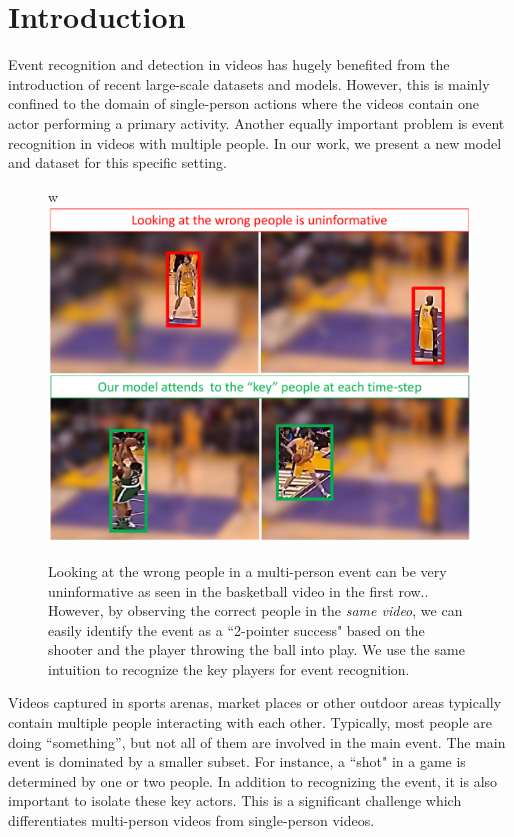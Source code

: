 \section{Introduction}

Event recognition and detection in videos has hugely benefited from the
introduction of recent large-scale datasets
\cite{THUMOS,UCF101,Karpathy_CVPR14,MED11} and models.  However, this is mainly
confined to the domain of single-person actions where the videos contain one
actor performing a primary activity.  Another equally important problem is
event recognition in videos with multiple people. In our work, we present a new
model and dataset for this specific setting.

\begin{figure}[ht!]
\begin{center}w
  \includegraphics[width=3.2 in]{images/pull_figure_v3_cropped.pdf}
\end{center}
\caption{Looking at the wrong people in a multi-person event can be very uninformative
  as seen in the basketball video in the first row.. However, by observing the correct
  people in the \emph{same video}, we can easily identify the event as a ``2-pointer success" based
  on the shooter and the player throwing the ball into play. We use the same intuition
to recognize the key players for event recognition.}
\label{fig:pull_figure}
\end{figure}

Videos captured in sports arenas, market places or other outdoor areas
typically contain multiple people interacting with each other.
Typically, most people are doing ``something'', but not all of them are involved in the main event.
The main event is dominated by a smaller subset. For instance, a ``shot" in a game
 is determined by one or two people.
In addition to recognizing the event, it is also important
to isolate these key actors. This is a significant challenge which
differentiates multi-person videos from single-person videos.

